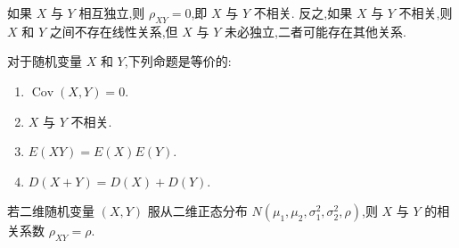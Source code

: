 如果 $X$ 与 $Y$ 相互独立,则 $\rho_{XY} = 0$,即 $X$ 与 $Y$ 不相关. 反之,如果 $X$ 与 $Y$ 不相关,则 $X$ 和 $Y$ 之间不存在线性关系,但 $X$ 与 $Y$ 未必独立,二者可能存在其他关系.

对于随机变量 $X$ 和 $Y$,下列命题是等价的:
\begin{enumerate}
    \item $\operatorname{Cov}(X,Y) = 0$.
    \item $X$ 与 $Y$ 不相关.
    \item $E(XY) = E(X) E(Y)$.
    \item $D(X+Y) = D(X) + D(Y)$.
\end{enumerate}

\begin{conclusion}
    若二维随机变量 $(X,Y)$ 服从二维正态分布 $N(\mu_1,\mu_2,\sigma_1^2,\sigma_2^2,\rho)$,则 $X$ 与 $Y$ 的相关系数 $\rho_{XY} = \rho$.
\end{conclusion}

